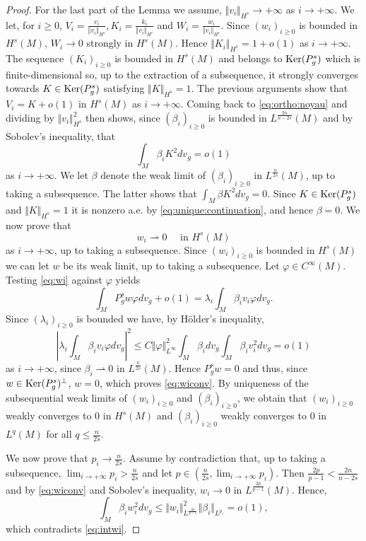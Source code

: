 \documentclass[10pt]{amsart}
\numberwithin{equation}{section}
\def\ker{{\mathop{\rm Ker}}}
\newcommand{\vp}{\varphi}
\theoremstyle{plain}
\theoremstyle{remark}
\begin{document}
\begin{proof}
For the last part of the Lemma we assume, $\Vert v_i \Vert_{H^s} \to +\infty$ as $i\to +\infty$. We let, for $i \ge 0$, $V_i = \frac{v_i}{\Vert v_i\Vert_{H^s}}, K_i = \frac{k_i}{\Vert v_i\Vert_{H^s}}$ and $W_i = \frac{w_i}{\Vert v_i\Vert_{H^s}}$.  Since $(w_i)_{i \ge 0}$ is bounded in $H^s(M)$, $W_i \to 0$ strongly in $H^s(M)$. Hence $\Vert K_i \Vert_{H^s} =1 + o(1)$ as $i \to + \infty$. The sequence $(K_i)_{i \ge0}$ is bounded in $H^s(M)$ and belongs to $\ker(P_g^s)$ which is finite-dimensional so, up to the extraction of a subsequence, it strongly converges towards $K \in \ker(P_g^s)$ satisfying $\Vert K \Vert_{H^s} = 1$. %
 The previous arguments show that $V_i = K + o(1)$ in $H^s(M)$ as $i \to + \infty$. 
 Coming back to \eqref{eq:ortho:noyau} and dividing by $\Vert v_i \Vert_{H^s}^2$ then shows, since $(\beta_i)_{i \ge0}$ is bounded in $L^{\frac{2n}{n-2s}}(M)$ and by Sobolev's inequality, that 
$$\int_M \beta_i K^2dv_g = o(1) $$
as $i \to + \infty$. We let $\beta$ denote the weak limit of $(\beta_i)_{i\ge0}$ in $L^{\frac{n}{2s}}(M)$, up to taking a subsequence. The latter shows that $\int_M \beta K^2dv_g = 0$. Since $K \in \ker(P_g^s)$ and $\Vert K \Vert_{H^s}= 1$ it is nonzero a.e. by \eqref{eq:unique:continuation}, and hence $\beta = 0$. We now prove that 
\begin{equation} \label{eq:wiconv}
w_i \rightharpoonup 0 \quad \text{  in } H^s(M)
\end{equation}
as $i \to + \infty$, up to taking a subsequence. Since $(w_i)_{i \ge0}$ is bounded in $H^s(M)$ we can let $w$ be its weak limit, up to taking a subsequence. Let $\vp \in C^{\infty}(M)$. Testing \eqref{eq:wi} against $\vp$ yields 
$$ \int_M P_g^s w \vp dv_g + o(1) = \lambda_i \int_M \beta_i v_i \vp dv_g. $$
Since $(\lambda_i)_{i \ge0}$ is bounded we have, by H\"older's inequality,
$$ \left|  \lambda_i \int_M \beta_i v_i \vp dv_g\right|^2 \le C\Vert \vp \Vert_{L^\infty}^2 \int_{M} \beta_i dv_g \int_M \beta_i v_i^2 dv_g = o(1)$$
as $i \to + \infty$, since $\beta_i \rightharpoonup 0$ in $L^{\frac{n}{2s}}(M)$. Hence $P_g^s w = 0$ and thus, since $w \in \ker(P_g^s)^{\perp}$, $w=0$, which proves \eqref{eq:wiconv}. By uniqueness of the subsequential  weak limits of $(w_i)_{i \ge 0}$ and $(\beta_i)_{i\geq 0}$, we obtain that $(w_i)_{i\geq 0}$ weakly converges to $0$ in $H^s(M)$ and $(\beta_i)_{i\geq 0}$ weakly converges to $0$ in $L^q(M)$ for all $q\leq \frac{n}{2s}$.


We now prove that $p_i \to \frac{n}{2s}$. Assume by contradiction that, up to taking a subsequence, $ \lim_{i \to + \infty} p_i > \frac{n}{2s}$ and let $p \in (\frac{n}{2s},  \lim_{i \to + \infty} p_i)$. Then $\frac{2p}{p-1} < \frac{2n}{n-2s}$ and by \eqref{eq:wiconv} and Sobolev's inequality, $w_i \to 0$ in $L^{\frac{2p}{p-1}}(M)$. Hence, 
$$  \int_M \beta_i w_i^2 dv_g \le \Vert w_i \Vert_{L^\frac{2p}{p-1}}^{2} \Vert \beta_i \Vert_{L^{p_i}} = o(1), $$
which contradicts \eqref{eq:intwi}. 


\end{proof}
\end{document}
